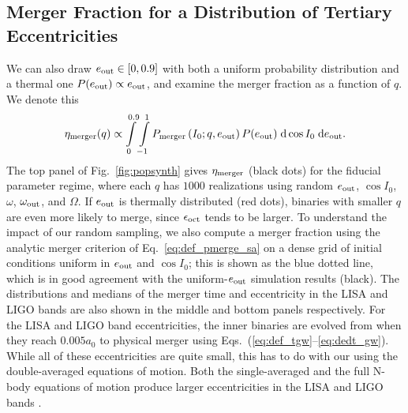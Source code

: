 \documentclass[
        fleqn,
        usenatbib,
    ]{mnras}
\newcommand*{\p}[1]{\left(#1\right)}
\begin{document}
\subsection{Merger Fraction for a Distribution of Tertiary Eccentricities}

We can also draw $e_{\rm out} \in [0, 0.9]$ with both a uniform probability
distribution and a thermal one $P(e_{\rm out}) \propto e_{\rm out}$, and examine
the merger fraction as a function of $q$. We denote this
\begin{equation}
    \eta_{\rm merger}(q) \propto
        \int\limits_{0}^{0.9}\int\limits_{-1}^1
            P_{\rm merger}\p{I_0; q, e_{\rm out}} P(e_{\rm out})
            \;\mathrm{d}\cos I_0\;\mathrm{d}e_{\rm out}.
\end{equation}
The top panel of Fig.~\ref{fig:popsynth} gives $\eta_{\rm merger}$ (black
dots) for the fiducial parameter regime, where each $q$ has $1000$ realizations
using random $e_{\rm out}$, $\cos I_0$, $\omega$, $\omega_{\rm out}$, and
$\Omega$. If $e_{\rm out}$ is thermally distributed (red dots), binaries with
smaller $q$ are even more likely to merge, since $\epsilon_{\rm oct}$ tends to
be larger. To understand the impact of our random sampling, we also compute a
merger fraction using the analytic merger criterion of
Eq.~\eqref{eq:def_pmerge_sa} on a dense grid of initial conditions uniform in
$e_{\rm out}$ and $\cos I_0$; this is shown as the blue dotted line, which is in
good agreement with the uniform-$e_{\rm out}$ simulation results (black). The
distributions and medians of the merger time and eccentricity in the LISA and
LIGO bands are also shown in the middle and bottom panels respectively. For the
LISA and LIGO band eccentricities, the inner binaries are evolved from when they
reach $0.005 a_0$ to physical merger using
Eqs.~(\ref{eq:def_tgw}--\ref{eq:dedt_gw}). While all of these eccentricities are
quite small, this has to do with our using the double-averaged equations of
motion. Both the single-averaged and the full N-body equations of motion produce
larger eccentricities in the LISA and LIGO bands \citep{LL19}.
\end{document}
